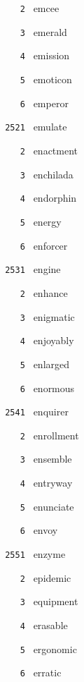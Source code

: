 \documentclass[11pt]{article}
\begin{document}
\begin{multicols}{6}
\noindent \texttt{ \ \ \ 2 } emcee  \par
\noindent \texttt{ \ \ \ 3 } emerald  \par
\noindent \texttt{ \ \ \ 4 } emission  \par
\noindent \texttt{ \ \ \ 5 } emoticon  \par
\noindent \texttt{ \ \ \ 6 } emperor  \par
\vspace{3mm}
\noindent \texttt{ 2521 } emulate  \par
\noindent \texttt{ \ \ \ 2 } enactment  \par
\noindent \texttt{ \ \ \ 3 } enchilada  \par
\noindent \texttt{ \ \ \ 4 } endorphin  \par
\noindent \texttt{ \ \ \ 5 } energy  \par
\noindent \texttt{ \ \ \ 6 } enforcer  \par
\vspace{3mm}
\noindent \texttt{ 2531 } engine  \par
\noindent \texttt{ \ \ \ 2 } enhance  \par
\noindent \texttt{ \ \ \ 3 } enigmatic  \par
\noindent \texttt{ \ \ \ 4 } enjoyably  \par
\noindent \texttt{ \ \ \ 5 } enlarged  \par
\noindent \texttt{ \ \ \ 6 } enormous  \par
\vspace{3mm}
\noindent \texttt{ 2541 } enquirer  \par
\noindent \texttt{ \ \ \ 2 } enrollment  \par
\noindent \texttt{ \ \ \ 3 } ensemble  \par
\noindent \texttt{ \ \ \ 4 } entryway  \par
\noindent \texttt{ \ \ \ 5 } enunciate  \par
\noindent \texttt{ \ \ \ 6 } envoy  \par
\vspace{3mm}
\noindent \texttt{ 2551 } enzyme  \par
\noindent \texttt{ \ \ \ 2 } epidemic  \par
\noindent \texttt{ \ \ \ 3 } equipment  \par
\noindent \texttt{ \ \ \ 4 } erasable  \par
\noindent \texttt{ \ \ \ 5 } ergonomic  \par
\noindent \texttt{ \ \ \ 6 } erratic  \par

\end{multicols}
\end{document}
